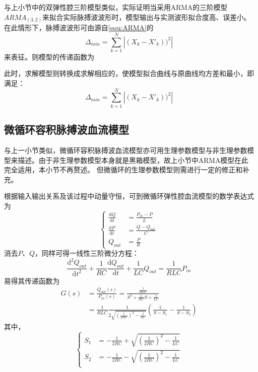 与上小节中的双弹性腔三阶模型类似，实际证明当采用ARMA的三阶模型$ARMA_{(3,2)}$来拟合实际脉搏波波形时，模型输出与实测波形拟合度高、误差小\cite{PPGYY}。在此情形下，脉搏波波形可由源自\autoref{equ:ARMA}的
\begin{equation}
    \label{equ:ARMA32}
    \Delta_{min}=\sum_{k=1}^{N}\left |  (X_k-X'_k))^2\right |
\end{equation}
来表征。则模型的传递函数为

此时，求解模型则转换成求解相应的，使模型拟合曲线与原曲线均方差和最小，即满足：
\begin{equation}
    \label{equ:MeanSum}
    \Delta_{min}=\sum_{k=1}^{N}\left |  (X_k-X'_k))^2\right |
\end{equation}
\subsection{微循环容积脉搏波血流模型}
与上一小节类似，微循环容积脉搏波血流模型亦可用生理参数模型与非生理参数模型来描述。由于非生理参数模型本身就是黑箱模型，故上小节中ARMA模型在此完全适用，本小节不再赘述。
但微循环的生理参数模型则需进行一定的修正和补充。

根据输入输出关系及该过程中动量守恒，可到微循环弹性腔血流模型的数学表达式为
\begin{equation}
    \label{equ:wxh1}
    \left \{
    \begin{aligned}
        \frac{\mathrm{d} Q}{\mathrm{d} t} &=\frac{P_{in}-P}{L}\\
        \frac{\mathrm{d} P}{\mathrm{d} t} &=\frac{Q-Q_{out}}{C}\\
        Q_{out} &=\frac{P}{R}
    \end{aligned}
    \right.
\end{equation}
消去$P$、$Q$，同样可得一线性三阶微分方程：
\begin{equation}
    \label{equ:wxh2}
    \frac{\mathrm{d^2} Q_{out}}{\mathrm{d} t^2}+\frac{1}{RC}\frac{\mathrm{d} Q_{out}}{\mathrm{d} t}+\frac{1}{LC}Q_{out}=\frac{1}{RLC}P_{in}
\end{equation}
易得其传递函数为
\begin{equation}
    \label{equ:hs}
    \begin{aligned}
    G(s) &=\frac{Q_{out}(s)}{P_{in}(s)}=\frac{\frac{1}{RLC}}{S^2+\frac{1}{RC}S+\frac{1}{LC}} \\
    &=\frac{1}{RLC}\frac{1}{2\sqrt{(\frac{1}{2RC})^2-\frac{1}{LC}}}(\frac{1}{S-S_{1}}-\frac{1}{S-S_{2}})
    \end{aligned}
\end{equation}
其中，
\begin{equation}
    \label{equ:ss}
    \left \{
    \begin{aligned}
        S_{1} &= -\frac{1}{2RC}+\sqrt{(\frac{1}{2RC})^2-\frac{1}{LC}}\\
        S_{2} &= -\frac{1}{2RC}-\sqrt{(\frac{1}{2RC})^2-\frac{1}{LC}}\\
    \end{aligned}
    \right.
\end{equation}
